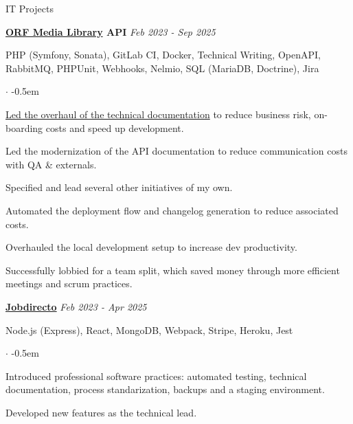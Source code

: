 \documentclass{cv}
\begin{document}
\break
\begin{rSection}{IT Projects}



  \textbf{\href{https://tvthek.orf.at/}{ORF Media Library} API}
  \hfill
  {\em Feb 2023 - Sep 2025}
  
  PHP (Symfony, Sonata), GitLab CI, Docker, Technical Writing, OpenAPI, RabbitMQ, PHPUnit, Webhooks, Nelmio, SQL (MariaDB, Doctrine), Jira
  \begin{list}{$\cdot$}{}
  \itemsep -0.5em \vspace{-0.5em}
    \smallskip
    \item \href{https://jneidel.com/dev/technical-documentation-with-arc42/}{Led the overhaul of the technical documentation} to reduce business risk, on-boarding costs and speed up development.
    \item Led the modernization of the API documentation to reduce communication costs with QA \& externals.
    \item Specified and lead several other initiatives of my own.
    \item Automated the deployment flow and changelog generation to reduce associated costs.
    \item Overhauled the local development setup to increase dev productivity.
    \item Successfully lobbied for a team split, which saved money through more efficient meetings and scrum practices.
  \end{list}

  \textbf{\href{https://www.jobdirecto.com/}{Jobdirecto}}
  \hfill
  {\em Feb 2023 - Apr 2025}
  
  Node.js (Express), React, MongoDB, Webpack, Stripe, Heroku, Jest
  \begin{list}{$\cdot$}{}
  \itemsep -0.5em \vspace{-0.5em}
    \smallskip
    \item Introduced professional software practices: automated testing, technical documentation, process standarization, backups and a staging environment.
    \item Developed new features as the technical lead.
  \end{list}


\end{rSection}
\end{document}
